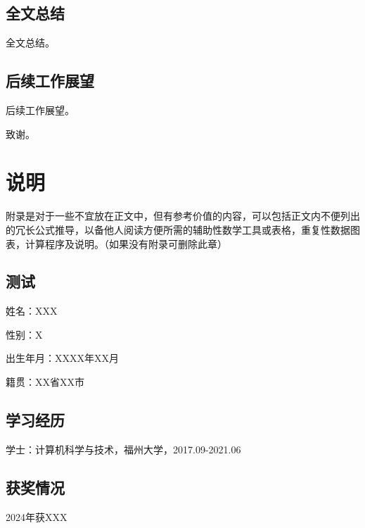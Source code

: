 \documentclass[engmaster]{thesis}
\begin{document}
\section{全文总结}
全文总结。


\section{后续工作展望}
后续工作展望。




\begin{thesisAcknowledgement}
  致谢。
\end{thesisAcknowledgement}


\thesisappendix
\chapter{说明}
附录是对于一些不宜放在正文中，但有参考价值的内容，可以包括正文内不便列出的冗长公式推导，以备他人阅读方便所需的辅助性数学工具或表格，重复性数据图表，计算程序及说明。（如果没有附录可删除此章） 
\section{测试}


\begin{thesisResume}
    \begin{description}[labelsep=0pt, leftmargin=*]
        \item 姓\hspace{24pt}名：XXX
        \item 性\hspace{24pt}别：X
        \item 出生年月：XXXX年XX月
        \item 籍\hspace{24pt}贯：XX省XX市
    \end{description}

    \section*{\heiti\fontsize{14pt}{16.8pt}\selectfont 学习经历}
    \begin{description}[labelsep=0pt, leftmargin=*]
        \item 学士：计算机科学与技术，福州大学，2017.09-2021.06
    \end{description}

    \section*{\heiti\fontsize{14pt}{16.8pt}\selectfont 获奖情况}
    \begin{description}[labelsep=0pt, leftmargin=*]
        \item 2024年获XXX
    \end{description}
\end{thesisResume}
\end{document}
